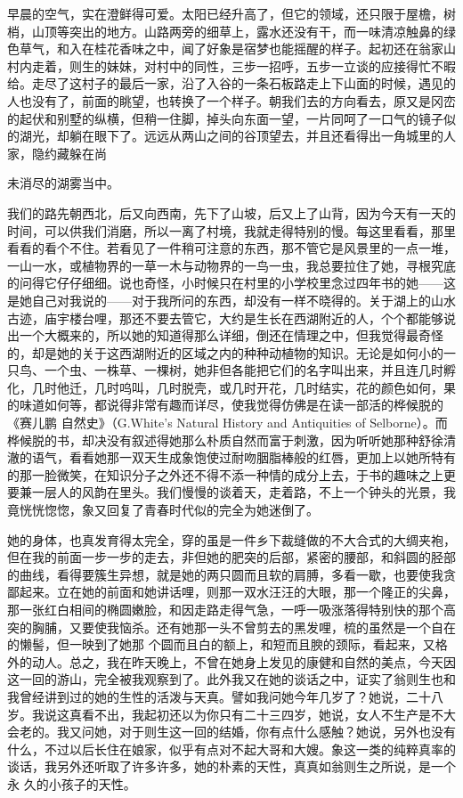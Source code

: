 \documentclass{article}
\begin{document}
早晨的空气，实在澄鲜得可爱。太阳已经升高了，但它的领域，还只限于屋檐，树梢，山顶等突出的地方。山路两旁的细草上，露水还没有干，而一味清凉触鼻的绿色草气，和入在桂花香味之中，闻了好象是宿梦也能摇醒的样子。起初还在翁家山村内走着，则生的妹妹，对村中的同性，三步一招呼，五步一立谈的应接得忙不暇给。走尽了这村子的最后一家，沿了入谷的一条石板路走上下山面的时候，遇见的人也没有了，前面的眺望，也转换了一个样子。朝我们去的方向看去，原又是冈峦的起伏和别墅的纵横，但稍一住脚，掉头向东面一望，一片同呵了一口气的镜子似的湖光，却躺在眼下了。远远从两山之间的谷顶望去，并且还看得出一角城里的人家，隐约藏躲在尚
\newpage

未消尽的湖雾当中。 

我们的路先朝西北，后又向西南，先下了山坡，后又上了山背，因为今天有一天的时间，可以供我们消磨，所以一离了村境，我就走得特别的慢。每这里看看，那里看看的看个不住。若看见了一件稍可注意的东西，那不管它是风景里的一点一堆，一山一水，或植物界的一草一木与动物界的一鸟一虫，我总要拉住了她，寻根究底的问得它仔仔细细。说也奇怪，小时候只在村里的小学校里念过四年书的她——这是她自己对我说的——对于我所问的东西，却没有一样不晓得的。关于湖上的山水古迹，庙宇楼台哩，那还不要去管它，大约是生长在西湖附近的人，个个都能够说出一个大概来的，所以她的知道得那么详细，倒还在情理之中，但我觉得最奇怪的，却是她的关于这西湖附近的区域之内的种种动植物的知识。无论是如何小的一只鸟、一个虫、一株草、一棵树，她非但各能把它们的名字叫出来，并且连几时孵化，几时他迁，几时呜叫，几时脱壳，或几时开花，几时结实，花的颜色如何，果的味道如何等，都说得非常有趣而详尽，使我觉得仿佛是在读一部活的桦候脱的《赛儿鹏
\newpage
自然史》（G.White's Natural History and Antiquities of Selborne）。而桦候脱的书，却决没有叙述得她那么朴质自然而富于刺激，因为听听她那种舒徐清澈的语气，看看她那一双天生成象饱使过耐吻胭脂棒般的红唇，更加上以她所特有的那一脸微笑，在知识分子之外还不得不添一种情的成分上去，于书的趣味之上更要兼一层人的风韵在里头。我们慢慢的谈着天，走着路，不上一个钟头的光景，我竟恍恍惚惚，象又回复了青春时代似的完全为她迷倒了。

她的身体，也真发育得太完全，穿的虽是一件乡下裁缝做的不大合式的大绸夹袍，但在我的前面一步一步的走去，非但她的肥突的后部，紧密的腰部，和斜圆的胫部的曲线，看得要簇生异想，就是她的两只圆而且软的肩膊，多看一歇，也要使我贪鄙起来。立在她的前面和她讲话哩，则那一双水汪汪的大眼，那一个隆正的尖鼻，那一张红白相间的椭圆嫩脸，和因走路走得气急，一呼一吸涨落得特别快的那个高突的胸脯，又要使我恼杀。还有她那一头不曾剪去的黑发哩，梳的虽然是一个自在的懒髻，但一映到了她那
\newpage
个圆而且白的额上，和短而且腴的颈际，看起来，又格外的动人。总之，我在昨天晚上，不曾在她身上发见的康健和自然的美点，今天因这一回的游山，完全被我观察到了。此外我又在她的谈话之中，证实了翁则生也和我曾经讲到过的她的生性的活泼与天真。譬如我问她今年几岁了？她说，二十八岁。我说这真看不出，我起初还以为你只有二十三四岁，她说，女人不生产是不大会老的。我又问她，对于则生这一回的结婚，你有点什么感触？她说，另外也没有什么，不过以后长住在娘家，似乎有点对不起大哥和大嫂。象这一类的纯粹真率的谈话，我另外还听取了许多许多，她的朴素的天性，真真如翁则生之所说，是一个永
久的小孩子的天性。 
\end{document}
